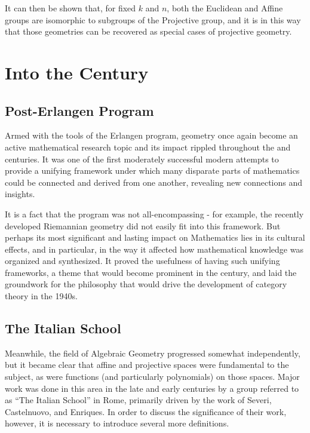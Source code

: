 \documentclass{article}
\theoremstyle{definition}
\begin{document}
It can then be shown that, for fixed \(k\) and \(n\), both the Euclidean
and Affine groups are isomorphic to subgroups of the Projective group,
and it is in this way that those geometries can be recovered as special
cases of projective geometry.

\section{Into the  Century}
\subsection{Post-Erlangen Program}\label{header-n112}

Armed with the tools of the Erlangen program, geometry once again become
an active mathematical research topic and its impact rippled
throughout the  and  centuries. It was one of the first moderately successful modern attempts
to provide a unifying framework under which many disparate parts of
mathematics could be connected and derived from one another, revealing
new connections and insights.

It is a fact that the program was not all-encompassing - for example,
the recently developed Riemannian geometry did not easily fit into
this framework. But perhaps its most significant and lasting impact on
Mathematics lies in its cultural effects, and in particular, in the way it affected how
mathematical knowledge was organized and synthesized. It proved the
usefulness of having such unifying frameworks, a theme that would become
prominent in the  century, and laid the groundwork for the
philosophy that would drive the development of category theory in the 1940s.

\subsection{The Italian School}\label{header-n104}

Meanwhile, the field of Algebraic Geometry progressed
somewhat independently, but it became clear that affine and projective spaces were
fundamental to the subject, as were functions (and particularly
polynomials) on those spaces. Major work was done in this area in the late  and early  centuries by a group referred to as ``The Italian School'' in Rome, primarily driven by the work of Severi, Castelnuovo, and Enriques. In order to discuss the significance of their work, however, it is necessary to introduce several more definitions.
\end{document}

